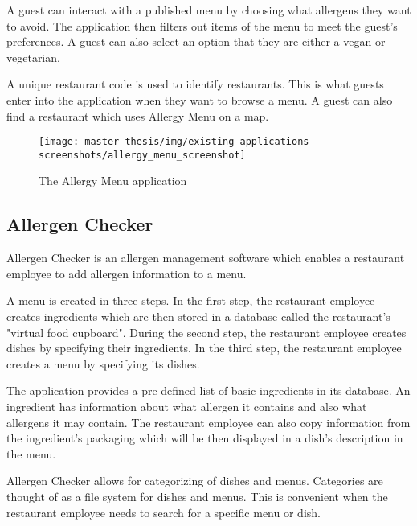   A guest can interact with a published menu by choosing what allergens they want to avoid.
  The application then filters out items of the menu to meet the guest's preferences.
  A guest can also select an option that they are either a vegan or vegetarian.
  
  A unique restaurant code is used to identify restaurants. 
  This is what guests enter into the application when they want to browse a menu.
  A guest can also find a restaurant which uses Allergy Menu on a map.

  \newpage

  \begin{figure}[h]
    \centering
    \texttt{[image: master-thesis/img/existing-applications-screenshots/allergy\_menu\_screenshot]}
    \caption{The Allergy Menu application}
  \end{figure}

\subsection*{Allergen Checker}
  Allergen Checker is an allergen management software which enables a restaurant employee to add allergen information to a menu.
  
  A menu is created in three steps.
  In the first step, the restaurant employee creates ingredients which are then stored in a database called the restaurant's "virtual food cupboard".
  During the second step, the restaurant employee creates dishes by specifying their ingredients.
  In the third step, the restaurant employee creates a menu by specifying its dishes.
  
  The application provides a pre-defined list of basic ingredients in its database.
  An ingredient has information about what allergen it contains and also what allergens it may contain. 
  The restaurant employee can also copy information from the ingredient's packaging which will be then displayed in a dish's description in the menu.
  
  Allergen Checker allows for categorizing of dishes and menus. 
  Categories are thought of as a file system for dishes and menus.
  This is convenient when the restaurant employee needs to search for a specific menu or dish.

